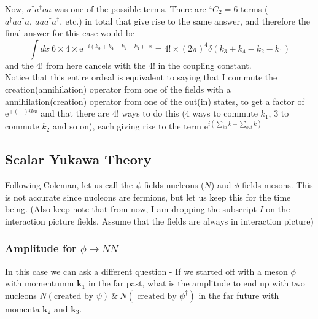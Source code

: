 \documentclass[11pt]{article}
\newcommand{\e}{\mathrm{e}}
\numberwithin{equation}{section}
\begin{document}
{        Now, \(a^\dagger a^\dagger a a\) was one of the possible terms. There are \({}^4C_2 = 6\) terms (\(a^\dagger a a^\dagger a,~aaa^\dagger a^\dagger,~\)etc.) in total that give rise to the same answer, and therefore the final answer for this case would be 
        \begin{equation*}
            \int dx ~6\times 4\times \e^{-i(k_3 + k_4 - k_2 - k_1)\cdot x} = 4! \times (2\pi)^4 \delta(k_3 + k_4 - k_2 - k_1)
        \end{equation*}
        and the \(4!\) from here cancels with the \(4!\) in the coupling constant. \\
        Notice that this entire ordeal is equivalent to saying that I commute the creation(annihilation) operator from one of the fields with a annihilation(creation) operator from one of the out(in) states, to get a factor of \(\e^{+(-)ikx}\) and that there are \(4!\) ways to do this (4 ways to commute \(k_1\), 3 to commute \(k_2\) and so on), each giving rise to the term \(\e^{i(\sum_{in}k - \sum_{out}k)}\)
    }

    \subsection{Scalar Yukawa Theory}
    Following Coleman, let us call the \(\psi\) fields nucleons (\(N\)) and \(\phi\) fields mesons. This is not accurate since nucleons are fermions, but let us keep this for the time being. (Also keep note that from now, I am dropping the subscript \(I\) on the interaction picture fields. Assume that the fields are always in interaction picture)
    
    \subsubsection{Amplitude for \(\phi\to N\bar{N}\)}
    In this case we can ask a different question - If we started off with a meson \(\phi\) with momentumm \(\textbf{k}_1\) in the far past, what is the amplitude to end up with two nucleons \(N (\text{created by }\psi)~\&~\bar{N} (\text{ created by }\psi^\dagger)\) in the far future with momenta \(\textbf{k}_2\) and \(\textbf{k}_3\). \\
\end{document}
